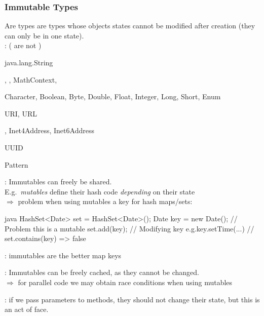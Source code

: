 \subsubsection{Immutable Types}
\label{subsubsec:ImmutableTypes}
\begin{defnbox}\nospacing
  \begin{defn}\label{defn:Immutable}
    Are types are types whose objects states cannot be modified after
    creation (they can only be in one state).\\
    : ( are not )
    \begin{itemizenosep}
      \item java.lang.String
      \item {}
      \item {}, , MathContext, 
      \item Character, Boolean, Byte, Double, Float, Integer, Long, Short, Enum
      \item URI, URL
      \item {}, Inet4Address, Inet6Address
      \item {}
      \item UUID
      \item Pattern
    \end{itemizenosep}
  \end{defn}
\end{defnbox}
\begin{sectionbox}[Benefits]\nospacing
  \begin{itemizenosep}
      \item {}: Immutables can freely be shared.\\
       E.g.\ \textit{mutables} define their hash code \textit{depending} on
       their state\\
       $\Rightarrow$ problem when using mutables a key for hash maps/sets:
       \begin{mintlinebox}{java}
         HashSet<Date> set = HashSet<Date>();
         Date key = new Date();  // Problem this is a mutable
         set.add(key); 
         // Modifying key e.g.key.setTime(...)
         // set.contains(key) => false
       \end{mintlinebox}
       : immutables are the better map keys
      \item {}: Immutables can be freely cached, as they cannot
    be changed. \\
    $\Rightarrow$ for parallel code we may obtain race conditions when using mutables
      \item {}: if we pass
    parameters to methods, they should not change their state, but this is an
    act of face.
  \end{itemizenosep}
\end{sectionbox}
